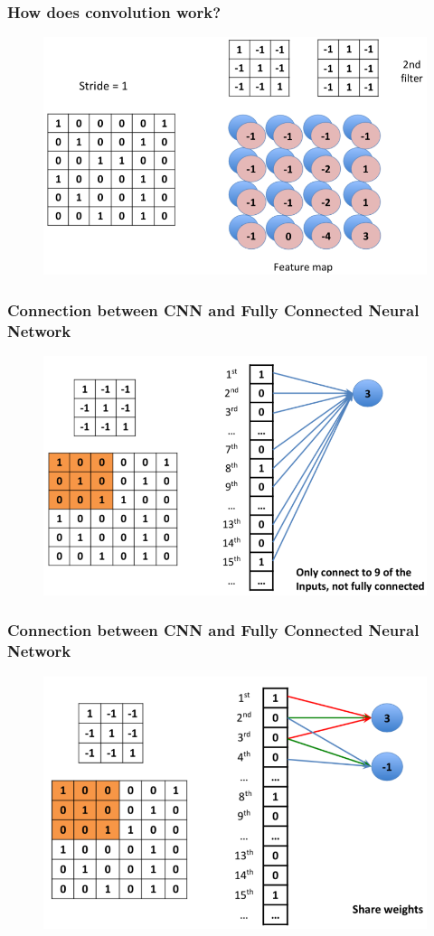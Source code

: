 \documentclass{beamer}
\begin{document}
\begin{frame}
	\frametitle{How does convolution work?}
	\begin{figure}
		\includegraphics[width=0.9\linewidth]{cnn_procedure_3}
	\end{figure}
\end{frame}

\begin{frame}
	\frametitle{Connection between CNN and Fully Connected Neural Network}
	\begin{figure}
		\includegraphics[width=0.9\linewidth]{cnn_procedure_4}
	\end{figure}
\end{frame}

\begin{frame}
	\frametitle{Connection between CNN and Fully Connected Neural Network}
	\begin{figure}
		\includegraphics[width=0.9\linewidth]{cnn_procedure_5}
	\end{figure}
\end{frame}
\end{document}
